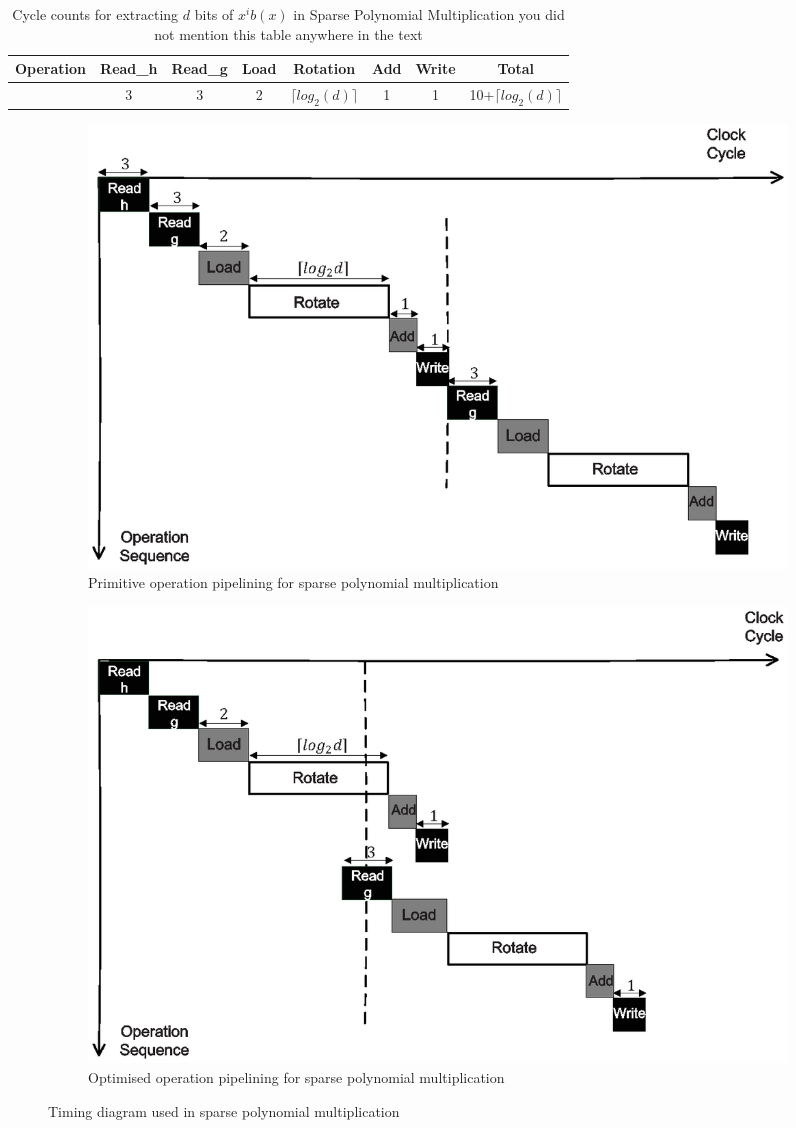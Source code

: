 \documentclass[runningheads]{llncs}
\begin{document}
\begin{table}[!tb]\centering
\caption{Cycle counts for extracting $d$ bits of $x^ib(x)$ in Sparse Polynomial Multiplication{\color{red} you did not mention this table anywhere in the text}}
\begin{tabular}{c|c|c|c|c|c|c|c}
  \hline
  Operation & Read\_h & Read\_g & Load &Rotation & Add & Write & Total \\\hline
   & 3 & 3 & 2 & $\lceil log_2(d)\rceil$ & 1 & 1& 10+$\lceil log_2(d)\rceil$ \\
  \hline
\end{tabular}
\end{table}

\begin{figure}[!tb]
\centering
\begin{subfigure}[t]{0.47\textwidth}\centering
\includegraphics[width=\textwidth]{./fig/pipeline_mul.eps}
\caption{Primitive operation pipelining for sparse polynomial multiplication}
\label{fig:pipeline_mul}
\end{subfigure}
\hspace{1em}
\begin{subfigure}[t]{0.47\textwidth}\centering
\includegraphics[width=\textwidth]{./fig/pipeline_mul2.eps}
\caption{Optimised operation pipelining for sparse polynomial multiplication }
\label{fig:pipeline_mul2}
\end{subfigure}
\caption{Timing diagram used in sparse polynomial multiplication}
\end{figure}
\end{document}
